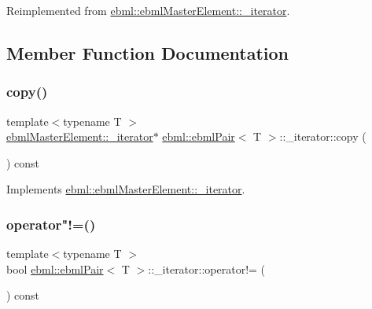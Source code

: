 Reimplemented from \mbox{\hyperlink{classebml_1_1ebmlMasterElement_1_1__iterator_a499f5fe9a5dddf51dd0ca181fc98f561}{ebml\+::ebml\+Master\+Element\+::\+\_\+iterator}}.



\subsection{Member Function Documentation}
\mbox{\label{classebml_1_1ebmlPair_1_1__iterator_a3f2945c8bbd6b161be18969c9a6ec260}} 
\subsubsection{\texorpdfstring{copy()}{copy()}}
{\footnotesize\ttfamily template$<$typename T $>$ \\
\mbox{\hyperlink{classebml_1_1ebmlMasterElement_1_1__iterator}{ebml\+Master\+Element\+::\+\_\+iterator}}$\ast$ \mbox{\hyperlink{classebml_1_1ebmlPair}{ebml\+::ebml\+Pair}}$<$ T $>$\+::\+\_\+iterator\+::copy (\begin{DoxyParamCaption}{ }\end{DoxyParamCaption}) const\hspace{0.3cm}{\ttfamily [virtual]}}



Implements \mbox{\hyperlink{classebml_1_1ebmlMasterElement_1_1__iterator_af9f522b6d6f34acb410add9579a35c13}{ebml\+::ebml\+Master\+Element\+::\+\_\+iterator}}.

\mbox{\label{classebml_1_1ebmlPair_1_1__iterator_a110f4b90bc4234c0e8f78160126e9baa}} 
\subsubsection{\texorpdfstring{operator"!=()}{operator!=()}}
{\footnotesize\ttfamily template$<$typename T $>$ \\
bool \mbox{\hyperlink{classebml_1_1ebmlPair}{ebml\+::ebml\+Pair}}$<$ T $>$\+::\+\_\+iterator\+::operator!= (\begin{DoxyParamCaption}\item[{const \mbox{\hyperlink{classebml_1_1ebmlMasterElement_1_1__iterator}{ebml\+Master\+Element\+::\+\_\+iterator}} \&}]{ }\end{DoxyParamCaption}) const\hspace{0.3cm}{\ttfamily [virtual]}}



